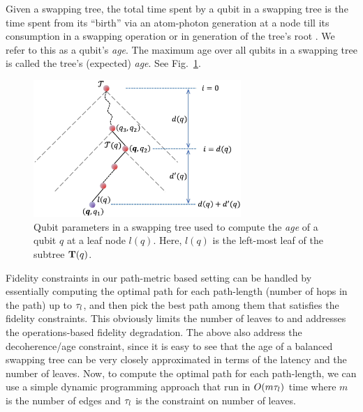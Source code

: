 \begin{definition}
    Given a swapping tree, the total time spent by a qubit in a swapping
    tree is the time spent from its ``birth'' via an atom-photon \eps generation at a node till its consumption
    in a swapping operation or in generation of the tree's root \eps. 
    We refer to this as a qubit's \textit{age}. The maximum age over all qubits 
    in a swapping tree is called the tree's (expected) \textit{age}. See Fig.~\ref{fig:swapping_age}.
\end{definition}

\begin{figure}
    \centering
    \includegraphics[width=0.7\textwidth]{chapters/tqe/figures/qubit-age.jpg}
  \caption{Qubit parameters in a swapping tree used to compute the \emph{age} of a qubit $q$ at a leaf node $l(q)$. Here, $l(q)$ is the left-most leaf of the subtree $\mathbf{T}(q)$.}
  \label{fig:swapping_age}
\end{figure}

Fidelity constraints in our path-metric based setting can be handled by essentially
computing the optimal path for each path-length (number of hops in the path) up to
$\tau_l$, and then pick the best path among them that satisfies the fidelity constraints.
This obviously limits the number of leaves to \fidl and addresses the operations-based
fidelity degradation. The above also address the decoherence/age
constraint, since it is easy to see %
that the age of a balanced swapping tree can be very closely 
approximated in terms of the latency and the number of leaves.
Now, to compute the optimal path for each path-length, we can use a simple dynamic
programming approach that run in $O(m\tau_l)$ time where $m$ is the number of edges 
and $\tau_l$ is the constraint on number of leaves. 